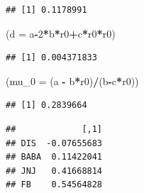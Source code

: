 \documentclass[]{article}
\newenvironment{Shaded}{\begin{snugshade}}{\end{snugshade}}
\newcommand{\DataTypeTok}[1]{\textcolor[rgb]{0.13,0.29,0.53}{#1}}
\newcommand{\DecValTok}[1]{\textcolor[rgb]{0.00,0.00,0.81}{#1}}
\newcommand{\StringTok}[1]{\textcolor[rgb]{0.31,0.60,0.02}{#1}}
\newcommand{\OperatorTok}[1]{\textcolor[rgb]{0.81,0.36,0.00}{\textbf{#1}}}
\newcommand{\NormalTok}[1]{#1}
\begin{document}
\begin{verbatim}
## [1] 0.1178991
\end{verbatim}

\begin{Shaded}
\begin{Highlighting}[]
\NormalTok{(}\DataTypeTok{d =}\NormalTok{ a}\OperatorTok{-}\DecValTok{2}\OperatorTok{*}\NormalTok{b}\OperatorTok{*}\NormalTok{r0}\OperatorTok{+}\NormalTok{c}\OperatorTok{*}\NormalTok{r0}\OperatorTok{*}\NormalTok{r0)}
\end{Highlighting}
\end{Shaded}

\begin{verbatim}
## [1] 0.004371833
\end{verbatim}

\begin{Shaded}
\begin{Highlighting}[]
\NormalTok{(}\DataTypeTok{mu_0 =}\NormalTok{ (a }\OperatorTok{-}\StringTok{ }\NormalTok{b}\OperatorTok{*}\NormalTok{r0)}\OperatorTok{/}\NormalTok{(b}\OperatorTok{-}\NormalTok{c}\OperatorTok{*}\NormalTok{r0))}
\end{Highlighting}
\end{Shaded}

\begin{verbatim}
## [1] 0.2839664
\end{verbatim}

\begin{Shaded}
\end{Shaded}

\begin{verbatim}
##             [,1]
## DIS  -0.07655683
## BABA  0.11422041
## JNJ   0.41668814
## FB    0.54564828
\end{verbatim}
\end{document}
